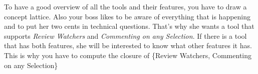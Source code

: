 \documentclass [11pt, a4wide, twoside]{article}
\begin{document}
To have a good overview of all the tools and their features, you have to draw a concept lattice. Also your boss likes to be aware of everything that is happening and to put her two cents in technical questions. That's why she wants a tool that supports \emph{Review Watchers} and \emph{Commenting on any Selection}. If there is a tool that has both features, she will be interested to know what other features it has. This is why you have to compute the closure of \{Review Watchers, Commenting on any Selection\}
\end{document}
